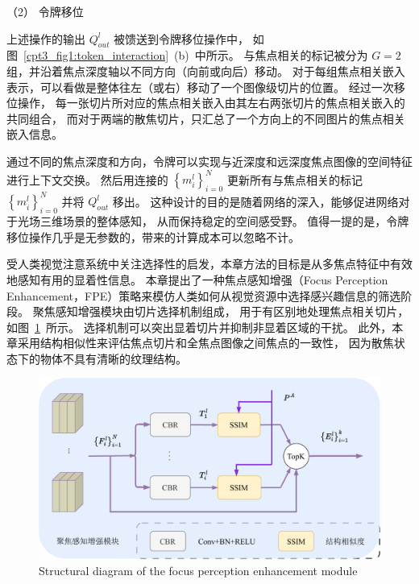 （2）
令牌移位




上述操作的输出 $ Q_{out}^{l} $ 被馈送到令牌移位操作中，
如图~\ref{cpt3_fig1:token_interaction}~(b)~中所示。 
与焦点相关的标记被分为 $G = 2$ 组，并沿着焦点深度轴以不同方向（向前或向后）移动。 
对于每组焦点相关嵌入表示，可以看做是整体往左（或右）移动了一个图像级切片的位置。
经过一次移位操作，
每一张切片所对应的焦点相关嵌入由其左右两张切片的焦点相关嵌入的共同组合，
而对于两端的散焦切片，只汇总了一个方向上的不同图片的焦点相关嵌入信息。




通过不同的焦点深度和方向，令牌可以实现与近深度和远深度焦点图像的空间特征进行上下文交换。 
然后用连接的 $ \left \{ m_{i}^{l} \right \}_{i=0}^{N} $ 更新所有与焦点相关的标记  $ \left \{ m_{i}^{l} \right \}_{i=0}^{N} $ 并将 
$ Q_{out}^{l} $ 移出。 
%
%
%
%
%
%
这种设计的目的是随着网络的深入，能够促进网络对于光场三维场景的整体感知，
从而保持稳定的空间感受野。 
值得一提的是，令牌移位操作几乎是无参数的，带来的计算成本可以忽略不计。










受人类视觉注意系统中关注选择性的启发，本章方法的目标是从多焦点特征中有效地感知有用的显着性信息。 
本章提出了一种焦点感知增强（Focus Perception Enhancement，FPE）策略来模仿人类如何从视觉资源中选择感兴趣信息的筛选阶段。 
聚焦感知增强模块由切片选择机制组成，
用于有区别地处理焦点相关切片，
如图~\ref{cpt3_fig1:fpe}~所示。
选择机制可以突出显着切片并抑制非显着区域的干扰。 
此外，本章采用结构相似性来评估焦点切片和全焦点图像之间焦点的一致性，
因为散焦状态下的物体不具有清晰的纹理结构。 




\begin{figure}[!ht]
	\centering
	\includegraphics[width=0.90\linewidth]{figures/chapter3/fpe}
	{Structural diagram of the focus perception enhancement module}
	\label{cpt3_fig1:fpe}
\end{figure}



